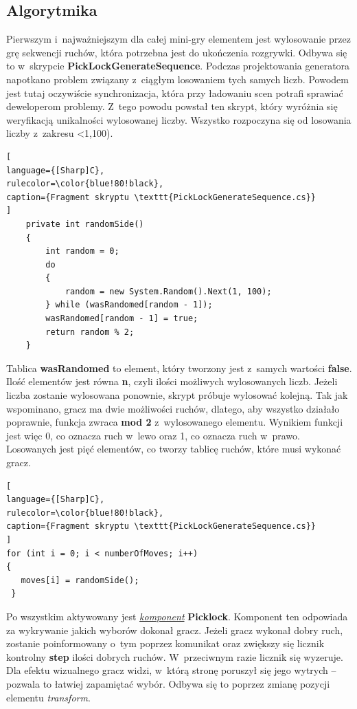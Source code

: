 \documentclass[oneside,polski,logo]{amuthesis}
\begin{document}
\subsection{Algorytmika}
\par Pierwszym i~najważniejszym dla całej mini-gry elementem jest wylosowanie przez grę sekwencji ruchów, która potrzebna jest do ukończenia rozgrywki. Odbywa się to w~skrypcie \textbf{PickLockGenerateSequence}. Podczas projektowania generatora napotkano problem związany z~ciągłym losowaniem tych samych liczb. Powodem jest tutaj oczywiście synchronizacja, która przy ładowaniu scen potrafi sprawiać deweloperom problemy. Z~tego powodu powstał ten skrypt, który wyróżnia się weryfikacją unikalności wylosowanej liczby.
Wszystko rozpoczyna się od losowania liczby z~zakresu <1,100).
\begin{lstlisting}[
language={[Sharp]C},
rulecolor=\color{blue!80!black},
caption={Fragment skryptu \texttt{PickLockGenerateSequence.cs}}
]
    private int randomSide()
    {
        int random = 0;
        do
        {
            random = new System.Random().Next(1, 100);
        } while (wasRandomed[random - 1]);
        wasRandomed[random - 1] = true;
        return random % 2;
    }
\end{lstlisting}
Tablica \textbf{wasRandomed} to element, który tworzony jest z~samych wartości \textbf{false}. Ilość elementów jest równa \textbf{n}, czyli ilości możliwych wylosowanych liczb. Jeżeli liczba zostanie wylosowana ponownie, skrypt próbuje wylosować kolejną. Tak jak wspominano, gracz ma dwie możliwości ruchów, dlatego, aby wszystko działało poprawnie, funkcja zwraca \textbf{mod 2} z~wylosowanego elementu. Wynikiem funkcji jest więc 0, co oznacza ruch w~lewo oraz 1, co oznacza ruch w~prawo. Losowanych jest pięć elementów, co tworzy tablicę ruchów, które musi wykonać gracz.

\begin{lstlisting}[
language={[Sharp]C},
rulecolor=\color{blue!80!black},
caption={Fragment skryptu \texttt{PickLockGenerateSequence.cs}}
]
for (int i = 0; i < numberOfMoves; i++)
{
   moves[i] = randomSide();
 }
\end{lstlisting}
Po wszystkim aktywowany jest \hyperref[sec:komponent]{\emph{komponent}} \textbf{Picklock}. Komponent ten odpowiada za wykrywanie jakich wyborów dokonał gracz. Jeżeli gracz wykonał dobry ruch, zostanie poinformowany o~tym poprzez komunikat oraz zwiększy się licznik kontrolny \textbf{step} ilości dobrych ruchów. W~przeciwnym razie licznik się wyzeruje. Dla efektu wizualnego gracz widzi, w~którą stronę poruszył się jego wytrych – pozwala to łatwiej zapamiętać wybór. Odbywa się to poprzez zmianę pozycji elementu \emph{transform}.
\end{document}
